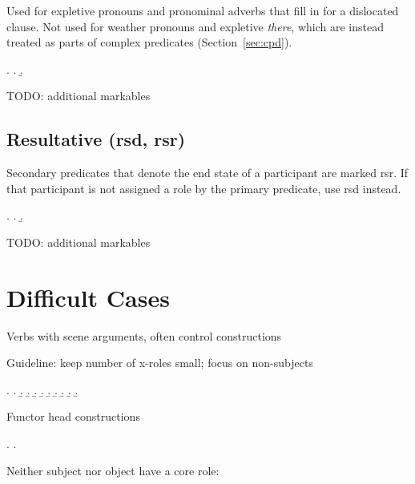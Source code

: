 \documentclass[a4paper]{article}
\begin{document}
Used for expletive pronouns and pronominal adverbs that fill in for a
dislocated clause. Not used for weather pronouns and expletive \emph{there},
which are instead treated as parts of complex predicates
(Section~\ref{sec:cpd}).

\ex.
\a. 
\b. 

TODO: additional markables

\clearpage
\subsection{Resultative (\textsf{rsd}, \textsf{rsr})}
\label{sec:rsd}\label{sec:rsr}

Secondary predicates that denote the end state of a participant are marked
\textsf{rsr}. If that participant is not assigned a role by the primary
predicate, use \textsf{rsd} instead.

\ex.
\a. 
\b. 

TODO: additional markables

\appendix

\clearpage
\section{Difficult Cases}

Verbs with scene arguments, often control constructions

Guideline: keep number of x-roles small; focus on non-subjects

\ex.
\a. 
\b. 
\b. 
\b. 
\b. 
\b. 
\b. 
\b. 
\b. 
\b. 

Functor head constructions

\ex. \a. 

Neither subject nor object have a core role:
\end{document}
